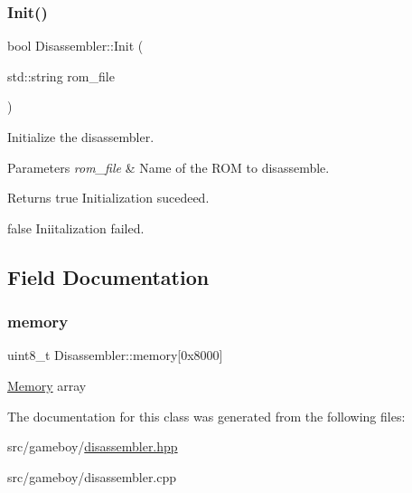 \subsubsection{\texorpdfstring{Init()}{Init()}}
{\footnotesize\ttfamily bool Disassembler\+::\+Init (\begin{DoxyParamCaption}\item[{std\+::string}]{rom\+\_\+file }\end{DoxyParamCaption})}



Initialize the disassembler. 


\begin{DoxyParams}{Parameters}
{\em rom\+\_\+file} & Name of the R\+OM to disassemble. \\
\hline
\end{DoxyParams}
\begin{DoxyReturn}{Returns}
true Initialization sucedeed. 

false Iniitalization failed. 
\end{DoxyReturn}


\subsection{Field Documentation}
\mbox{\label{classDisassembler_a190fc196a73e182f4d9b8292290196c0}} 
\subsubsection{\texorpdfstring{memory}{memory}}
{\footnotesize\ttfamily uint8\+\_\+t Disassembler\+::memory\mbox{[}0x8000\mbox{]}\hspace{0.3cm}{\ttfamily [private]}}

\mbox{\hyperlink{classMemory}{Memory}} array 

The documentation for this class was generated from the following files\+:\begin{DoxyCompactItemize}
\item 
src/gameboy/\mbox{\hyperlink{disassembler_8hpp}{disassembler.\+hpp}}\item 
src/gameboy/disassembler.\+cpp\end{DoxyCompactItemize}
